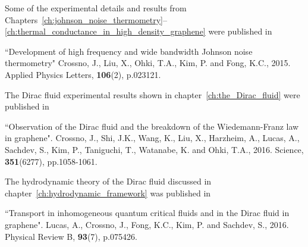 Some of the experimental details and results from Chapters~\ref{ch:johnson_noise_thermometry}--\ref{ch:thermal_conductance_in_high_density_graphene} were published in

\hfill\begin{minipage}{\dimexpr\textwidth-1cm}
``Development of high frequency and wide bandwidth Johnson noise thermometry" Crossno, J., Liu, X., Ohki, T.A., Kim, P. and Fong, K.C., 2015. Applied Physics Letters, \textbf{106}(2), p.023121.

\end{minipage}


The Dirac fluid experimental results shown in chapter~\ref{ch:the_Dirac_fluid} were published in

``Observation of the Dirac fluid and the breakdown of the Wiedemann-Franz law in graphene". Crossno, J., Shi, J.K., Wang, K., Liu, X., Harzheim, A., Lucas, A., Sachdev, S., Kim, P., Taniguchi, T., Watanabe, K. and Ohki, T.A., 2016. Science, \textbf{351}(6277), pp.1058-1061.

The hydrodynamic theory of the Dirac fluid discussed in chapter~\ref{ch:hydrodynamic_framework} was published in

``Transport in inhomogeneous quantum critical fluids and in the Dirac fluid in graphene". Lucas, A., Crossno, J., Fong, K.C., Kim, P. and Sachdev, S., 2016. Physical Review B, \textbf{93}(7), p.075426.